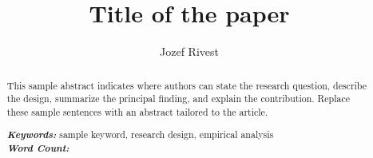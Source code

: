 \documentclass[12pt]{article}
\title{Title of the paper}
\author{Jozef Rivest}
\begin{document}
\maketitle

\begin{abstract}
	\noindent
	This sample abstract indicates where authors can state the research
	question, describe the design, summarize the principal finding,
	and explain the contribution. Replace these sample sentences
	with an abstract tailored to the article.

	\vspace{0.2in}

	\noindent\textit{\textbf{Keywords:}} sample keyword, research design, empirical analysis \\
	\noindent\textit{\textbf{Word Count:}} \wordcount
\end{abstract}
\clearpage








\printbibliography
\clearpage


\end{document}

